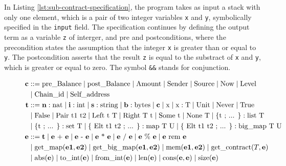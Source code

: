 \documentclass[runningheads]{llncs}
\begin{document}
In Listing \ref{lst:sub-contract-specification}, the program takes as input a stack with only one
element, which is a pair of two integer variables \lstinline/x/ and \lstinline/y/, symbolically specified in the \lstinline|input| field. 
The specification continues by defining the output term as a variable \lstinline/z/ of interger, and 
pre and postconditions, where the precondition states the assumption
that the integer \lstinline/x/ is greater than or equal to  \lstinline/y/. The postcondition asserts that the result
\lstinline/z/ is equal to the substract of
\lstinline/x/ and \lstinline/y/, which is greater or equal to
zero. The symbol \lstinline/&&/ stands for conjunction. 
\begin{figure}[tp]
\begin{align*}
\textbf{c} & ::= 
    \text{pre\_Balance}
   \Mid \text{post\_Balance}
   \Mid \text{Amount}
   \Mid \text{Sender}
   \Mid \text{Source} 
   \Mid \text{Now}
   \Mid \text{Level} \\
   &\Mid \text{Chain\_id}
   \Mid \text{Self\_address}\\
\textbf{t} &::= 
   \textbf{n}: \text{nat}
   \Mid \textbf{i}: \text{int}
   \Mid  \textbf{s}: \text{string} 
   \Mid  \textbf{b}: \text{bytes}
   \Mid  \textbf{c}  
   \Mid  \text{x} 
   \Mid \text{x}: \text{T} 
   \Mid \UNIT 
   \Mid \NEVER 
   \Mid \TRUE \\
   &\Mid \FALSE 
   \Mid \PAIR\ \text{t1 t2}
   \Mid \LEFT\ \text{t}\  \text{T}
   \Mid \RIGHT\ \text{T}\ \text{t}
   \Mid \SOME\ \text{t}
   \Mid \NONE\ \text{T} 
   \Mid \text{\{t ; ... \}}: \text{list T} \\
   &\Mid \text{\{t ; ... \}}: \text{set T} 
   \Mid \text{\{ Elt t1 t2 ; ... \}}: \text{map T U}
   \Mid \text{\{ Elt t1 t2 ; ... \}}: \text{big\_map T U} \\
\textbf{e} & :: = \textbf{t}  \Mid \textbf{e} \text{ + } \textbf{e}\Mid \textbf{e} \text{ - } \textbf{e}  \Mid \textbf{e} \text{ * } \textbf{e} \Mid \textbf{e} \text{ / } \textbf{e} \Mid \textbf{e} \text{ \% } \textbf{e} \Mid \textbf{e} \text{ rem } \textbf{e} \\
& 
 \Mid \text{get\_map} (\textbf{e1}, \textbf{e2}) 
 \Mid \text{get\_big\_map} (\textbf{e1}, \textbf{e2})  
 \Mid \text{mem} (\textbf{e1}, \textbf{e2})  
 \Mid \text{get\_contract} (T, \textbf{e})    \\
& \Mid \text{abs} (\textbf{e})  
 \Mid \text{to\_int} (\textbf{e})  
 \Mid \text{from\_int} (\textbf{e})  
 \Mid \text{len} (\textbf{e})
 \Mid \text{cons} (\textbf{e}, \textbf{e})
 \Mid \text{size} (\textbf{e})

\end{align*}
\end{figure}
\end{document}
